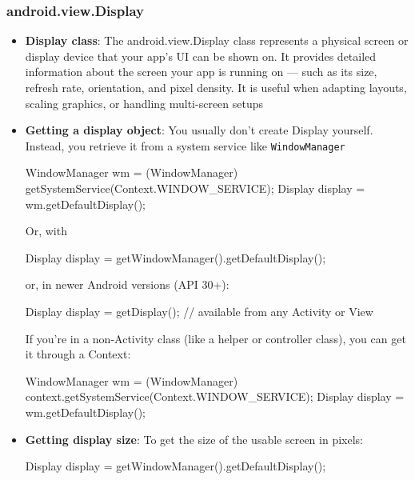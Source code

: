 \documentclass{report}
\begin{document}
    \subsubsection{android.view.Display}
    \begin{itemize}
        \item \textbf{Display class}: The android.view.Display class represents a physical screen or display device that your app’s UI can be shown on. It provides detailed information about the screen your app is running on — such as its size, refresh rate, orientation, and pixel density.
            \bigbreak \noindent 
            It is useful when adapting layouts, scaling graphics, or handling multi-screen setups
        \item \textbf{Getting a display object}: You usually don’t create Display yourself. Instead, you retrieve it from a system service like \texttt{WindowManager}
            \bigbreak \noindent 
            \begin{javacode}
                WindowManager wm = (WindowManager) getSystemService(Context.WINDOW_SERVICE);
                Display display = wm.getDefaultDisplay();
            \end{javacode}
            \bigbreak \noindent 
            Or, with
            \bigbreak \noindent 
            \begin{javacode}
            Display display = getWindowManager().getDefaultDisplay();
            \end{javacode}
            \bigbreak \noindent 
            or, in newer Android versions (API 30+):
            \bigbreak \noindent 
            \begin{javacode}
            Display display = getDisplay();  // available from any Activity or View
            \end{javacode}
            \bigbreak \noindent 
            If you’re in a non-Activity class (like a helper or controller class), you can get it through a Context:
            \bigbreak \noindent 
            \begin{javacode}
                WindowManager wm = (WindowManager) context.getSystemService(Context.WINDOW_SERVICE);
                Display display = wm.getDefaultDisplay();
            \end{javacode}

        \item \textbf{Getting display size}: To get the size of the usable screen in pixels:
            \bigbreak \noindent 
            \begin{javacode}
                Display display = getWindowManager().getDefaultDisplay();


\end{javacode}
\end{itemize}
\end{document}
